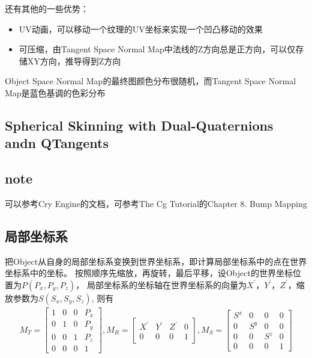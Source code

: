 还有其他的一些优势：
\begin{itemize}
    \item {UV动画，可以移动一个纹理的UV坐标来实现一个凹凸移动的效果}
    \item {可压缩，由Tangent Space Normal Map中法线的Z方向总是正方向，可以仅存储XY方向，推导得到Z方向}
\end{itemize}

Object Space Normal Map的最终图颜色分布很随机，而Tangent Space Normal Map是蓝色基调的色彩分布

\subsection{Spherical Skinning with Dual-Quaternions andn QTangents}

\subsection{note}
可以参考Cry Engine的文档，可参考The Cg Tutorial的Chapter 8. Bump Mapping



\subsection{局部坐标系}
把Object从自身的局部坐标系变换到世界坐标系，即计算局部坐标系中的点在世界坐标系中的坐标。
按照顺序先缩放，再旋转，最后平移，设Object的世界坐标位置为$P(P_{x},P_{y}, P_{z})$，
局部坐标系的坐标轴在世界坐标系的向量为$X^{'}$，$Y^{'}$，$Z^{'}$，缩放参数为$S(S_{x},S_{y}, S_{z})$,
则有
\begin{gather*}
    M_{T} = 
    \begin{bmatrix}
        1 & 0 & 0 & P_{x} \\ 
        0 & 1 & 0 & P_{y} \\
        0 & 0 & 1 & P_{z} \\
        0 & 0 & 0 & 1
    \end{bmatrix},
    M_{R} = 
    \begin{bmatrix}
        X^{'} & Y^{'} & Z^{'} & 0 \\ 
        0 & 0 & 0 & 1
    \end{bmatrix},
    M_{S} = 
    \begin{bmatrix}
        S^{x} & 0 & 0 & 0 \\ 
        0 & S^{y} & 0 & 0 \\
        0 & 0 & S^{z} & 0 \\
        0 & 0 & 0 & 1
    \end{bmatrix}
\end{gather*}

